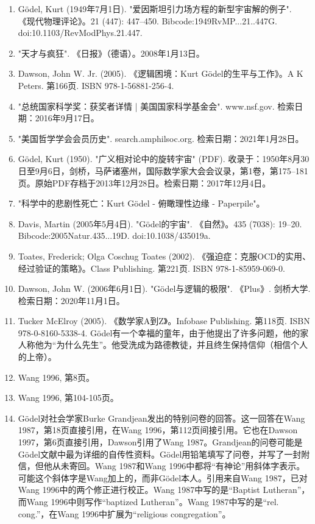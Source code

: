 \begin{enumerate}
\item Gödel, Kurt (1949年7月1日). "爱因斯坦引力场方程的新型宇宙解的例子". 《现代物理评论》。21 (447): 447–450. Bibcode:1949RvMP...21..447G. doi:10.1103/RevModPhys.21.447.  
\item "天才与疯狂". 《日报》（德语）。2008年1月13日。  
\item Dawson, John W. Jr. (2005). 《逻辑困境：Kurt Gödel的生平与工作》。A K Peters. 第166页. ISBN 978-1-56881-256-4.  
\item "总统国家科学奖：获奖者详情 | 美国国家科学基金会". www.nsf.gov. 检索日期：2016年9月17日。  
\item "美国哲学学会会员历史". search.amphilsoc.org. 检索日期：2021年1月28日。  
\item Gödel, Kurt (1950). "广义相对论中的旋转宇宙" (PDF). 收录于：1950年8月30日至9月6日，剑桥，马萨诸塞州，国际数学家大会会议录，第1卷，第175–181页。原始PDF存档于2013年12月28日。检索日期：2017年12月4日。  
\item "科学中的悲剧性死亡：Kurt Gödel - 俯瞰理性边缘 - Paperpile"。  
\item Davis, Martin (2005年5月4日). "Gödel的宇宙". 《自然》。435 (7038): 19–20. Bibcode:2005Natur.435...19D. doi:10.1038/435019a.
\item Toates, Frederick; Olga Coschug Toates (2002). 《强迫症：克服OCD的实用、经过验证的策略》。Class Publishing. 第221页. ISBN 978-1-85959-069-0.  
\item Dawson, John W. (2006年6月1日). "Gödel与逻辑的极限". 《Plus》. 剑桥大学. 检索日期：2020年11月1日。  
\item Tucker McElroy (2005). 《数学家A到Z》。Infobase Publishing. 第118页. ISBN 978-0-8160-5338-4. Gödel有一个幸福的童年，由于他提出了许多问题，他的家人称他为“为什么先生”。他受洗成为路德教徒，并且终生保持信仰（相信个人的上帝）。  
\item Wang 1996, 第8页。  
\item Wang 1996, 第104-105页。  
\item Gödel对社会学家Burke Grandjean发出的特别问卷的回答。这一回答在Wang 1987，第18页直接引用，在Wang 1996，第112页间接引用。它也在Dawson 1997，第6页直接引用，Dawson引用了Wang 1987。Grandjean的问卷可能是Gödel文献中最为详细的自传性资料。Gödel用铅笔填写了问卷，并写了一封附信，但他从未寄回。Wang 1987和Wang 1996中都将“有神论”用斜体字表示。可能这个斜体字是Wang加上的，而非Gödel本人。引用来自Wang 1987，已对Wang 1996中的两个修正进行校正。Wang 1987中写的是“Baptist Lutheran”，而Wang 1996中则写作“baptized Lutheran”。Wang 1987中写的是“rel. cong.”，在Wang 1996中扩展为“religious congregation”。

\end{enumerate}
